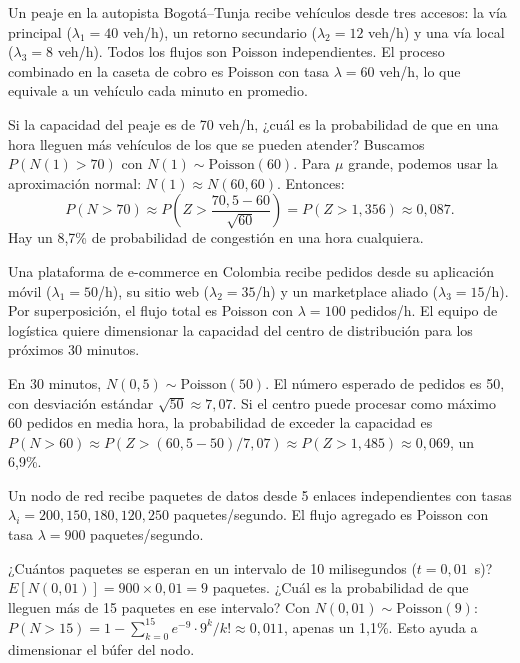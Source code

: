 \documentclass[11pt, letterpaper]{article}
\begin{document}
\begin{ejemplo}
Un peaje en la autopista Bogotá--Tunja recibe vehículos desde tres accesos: la vía principal ($\lambda_1 = 40$ veh/h), un retorno secundario ($\lambda_2 = 12$ veh/h) y una vía local ($\lambda_3 = 8$ veh/h). Todos los flujos son Poisson independientes. El proceso combinado en la caseta de cobro es Poisson con tasa $\lambda = 60$ veh/h, lo que equivale a un vehículo cada minuto en promedio.

Si la capacidad del peaje es de 70 veh/h, ¿cuál es la probabilidad de que en una hora lleguen más vehículos de los que se pueden atender? Buscamos $P(N(1) > 70)$ con $N(1) \sim \text{Poisson}(60)$. Para $\mu$ grande, podemos usar la aproximación normal: $N(1) \approx N(60, 60)$. Entonces:
\[
P(N > 70) \approx P\!\left(Z > \frac{70{,}5 - 60}{\sqrt{60}}\right) = P(Z > 1{,}356) \approx 0{,}087.
\]
Hay un 8{,}7\% de probabilidad de congestión en una hora cualquiera.
\end{ejemplo}

\begin{ejemplo}
Una plataforma de e-commerce en Colombia recibe pedidos desde su aplicación móvil ($\lambda_1 = 50$/h), su sitio web ($\lambda_2 = 35$/h) y un marketplace aliado ($\lambda_3 = 15$/h). Por superposición, el flujo total es Poisson con $\lambda = 100$ pedidos/h. El equipo de logística quiere dimensionar la capacidad del centro de distribución para los próximos 30 minutos.

En 30 minutos, $N(0{,}5) \sim \text{Poisson}(50)$. El número esperado de pedidos es 50, con desviación estándar $\sqrt{50} \approx 7{,}07$. Si el centro puede procesar como máximo 60 pedidos en media hora, la probabilidad de exceder la capacidad es $P(N > 60) \approx P(Z > (60{,}5-50)/7{,}07) \approx P(Z > 1{,}485) \approx 0{,}069$, un 6{,}9\%.
\end{ejemplo}

\begin{ejemplo}
Un nodo de red recibe paquetes de datos desde 5 enlaces independientes con tasas $\lambda_i = 200, 150, 180, 120, 250$ paquetes/segundo. El flujo agregado es Poisson con tasa $\lambda = 900$ paquetes/segundo.

¿Cuántos paquetes se esperan en un intervalo de 10 milisegundos ($t = 0{,}01$~s)? $E[N(0{,}01)] = 900 \times 0{,}01 = 9$ paquetes. ¿Cuál es la probabilidad de que lleguen más de 15 paquetes en ese intervalo? Con $N(0{,}01) \sim \text{Poisson}(9)$: $P(N > 15) = 1 - \sum_{k=0}^{15} e^{-9}\cdot 9^k/k! \approx 0{,}011$, apenas un 1{,}1\%. Esto ayuda a dimensionar el búfer del nodo.
\end{ejemplo}
\end{document}
